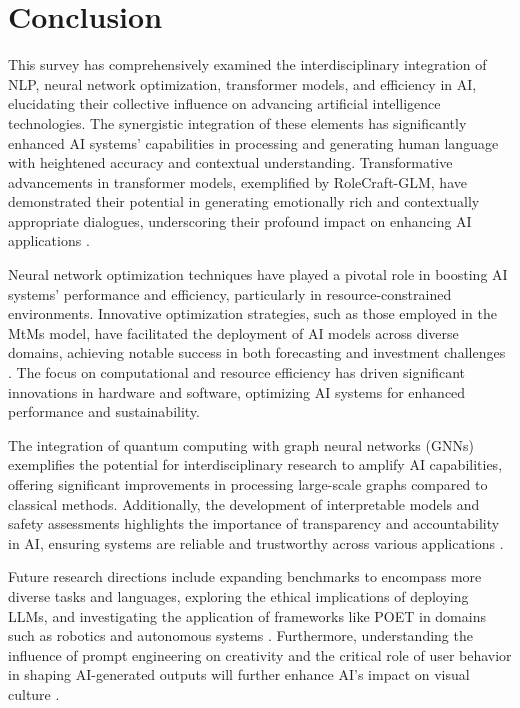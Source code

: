\section{Conclusion} \label{sec:Conclusion}





This survey has comprehensively examined the interdisciplinary integration of NLP, neural network optimization, transformer models, and efficiency in AI, elucidating their collective influence on advancing artificial intelligence technologies. The synergistic integration of these elements has significantly enhanced AI systems' capabilities in processing and generating human language with heightened accuracy and contextual understanding. Transformative advancements in transformer models, exemplified by RoleCraft-GLM, have demonstrated their potential in generating emotionally rich and contextually appropriate dialogues, underscoring their profound impact on enhancing AI applications \cite{tao2024rolecraftglmadvancingpersonalizedroleplaying}.



Neural network optimization techniques have played a pivotal role in boosting AI systems' performance and efficiency, particularly in resource-constrained environments. Innovative optimization strategies, such as those employed in the MtMs model, have facilitated the deployment of AI models across diverse domains, achieving notable success in both forecasting and investment challenges \cite{stank2024designingtimeseriesmodelshypernetworks}. The focus on computational and resource efficiency has driven significant innovations in hardware and software, optimizing AI systems for enhanced performance and sustainability.



The integration of quantum computing with graph neural networks (GNNs) exemplifies the potential for interdisciplinary research to amplify AI capabilities, offering significant improvements in processing large-scale graphs compared to classical methods. Additionally, the development of interpretable models and safety assessments highlights the importance of transparency and accountability in AI, ensuring systems are reliable and trustworthy across various applications \cite{ge2024psppretrainingstructureprompt}. 



Future research directions include expanding benchmarks to encompass more diverse tasks and languages, exploring the ethical implications of deploying LLMs, and investigating the application of frameworks like POET in domains such as robotics and autonomous systems \cite{wang2019pairedopenendedtrailblazerpoet}. Furthermore, understanding the influence of prompt engineering on creativity and the critical role of user behavior in shaping AI-generated outputs will further enhance AI's impact on visual culture \cite{palmini2024patternscreativityuserinput}.



